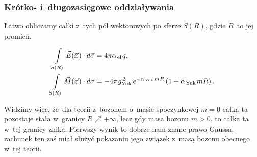 \documentclass[10pt,t]{beamer}
\begin{document}
\begin{frame}
  \frametitle{Krótko- i~długozasięgowe oddziaływania}


  Łatwo obliczamy całki z~tych pól wektorowych po sferze $S( R )$, gdzie
  $R$~to jej promień.

  \vspace{-1.5em}


  \begin{subequations}

    \begin{align}
      \label{eq:Glowne-rodzaje-problemow-podczerwonych-07-A}
      \int\limits_{ S( R ) } \vec{E}( \vec{x} \hspace{0.05em} ) \cdot d\vec{ \sigma }
      &= 4 \pi \alpha_{ \hspace{0.09em} \text{el} } \hspace{0.09em} q, \\
      \label{eq:Glowne-rodzaje-problemow-podczerwonych-07-B}
      \int\limits_{ S( R ) } \vec{ M }( \vec{x} \hspace{0.05em} ) \cdot d\vec{ \sigma }
      &=
        -4 \pi \hspace{0.07em} g_{ \text{Yuk} }^{ \, 2 } \,
        e^{ -\alpha_{ \hspace{0.09em} \text{Yuk} } \hspace{0.09em} m \hspace{0.05em} R }
        \left( 1 + \alpha_{ \hspace{0.09em} \text{Yuk} } \hspace{0.09em} m R \right).
    \end{align}

  \end{subequations}

  \vspace{-1em}



  Widzimy więc, że~dla teorii z~bozonem o~masie spoczynkowej $m = 0$
  całka ta pozostaje stała w~granicy $R \nearrow +\infty$, lecz gdy masa bozonu
  $m > 0$, to całka ta w~tej granicy znika. Pierwszy wynik to dobrze nam
  znane prawo Gaussa, rachunek ten zaś miał służyć pokazaniu jego związek
  z~masą bozonu obecnego w~tej teorii.

\end{frame}
\end{document}
